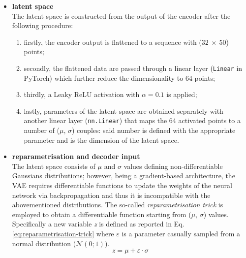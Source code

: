 \begin{itemize}
\begin{enumerate}
\begin{equation}
        \end{equation}
        \item another 1D convolutional layer with kernel size = 5, stride = 2 and padding = 2, , mapping (16 $\times 100$) objects from the previous layer into ($32~\times~50$) outputs;
        \item another Leaky ReLU activation function identical to the previous one.
    \end{enumerate} 
    \item \textbf{latent space}\\
    The latent space is constructed from the output of the encoder after the following procedure:
    \begin{enumerate}
        \item firstly, the encoder output is flattened to a sequence with ($32~\times~50$) points;
        \item secondly, the flattened data are passed through a linear layer (\texttt{Linear} in PyTorch) which further reduce the dimensionality to 64 points;
        \item thirdly, a Leaky ReLU activation with $\alpha=0.1$ is applied;
        \item lastly, parameters of the latent space are obtained separately with another linear layer (\texttt{nn.Linear}) that maps the 64 activated points to a number of ($\mu$, $\sigma$) couples: said number is defined with the appropriate parameter and is the dimension of the latent space.
    \end{enumerate}
    \item \textbf{reparametrisation and decoder input}\\
    The latent space consists of $\mu$ and $\sigma$ values defining non-differentiable Gaussians distributions; however, being a gradient-based architecture, the \ac{VAE} requires differentiable functions to update the weights of the neural network via backpropagation and thus it is incompatible with the abovementioned distributions. The so-called \textit{reparametrisation trick} is employed to obtain a differentiable function starting from ($\mu$, $\sigma$) values. Specifically a new variable \textit{z} is defined as reported in Eq. \ref{eq:reparametrisation-trick} where $\varepsilon$ is a parameter casually sampled from a normal distribution ($\mathcal{N}(0; 1)$).
    \begin{equation}
        \label{eq:reparametrisation-trick}
        z = \mu + \varepsilon \cdot \sigma
    \end{equation}

\end{itemize}
